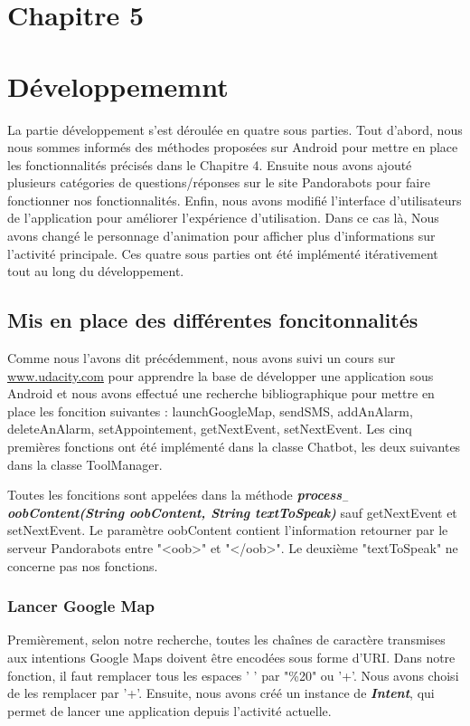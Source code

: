 \section*{Chapitre 5}
\section{Développememnt}
	La partie développement s'est déroulée en quatre sous parties. Tout d'abord, nous nous sommes informés des méthodes proposées sur Android pour mettre en place les fonctionnalités précisés dans le Chapitre 4. Ensuite nous avons ajouté plusieurs catégories de questions/réponses sur le site Pandorabots pour faire fonctionner nos fonctionnalités. Enfin, nous avons modifié l'interface d'utilisateurs de l'application pour améliorer l'expérience d'utilisation. Dans ce cas là, Nous avons changé le personnage d'animation pour afficher plus d'informations sur l'activité principale. Ces quatre sous parties ont été implémenté itérativement tout au long du développement.

\subsection{Mis en place des différentes foncitonnalités}
	
\indent Comme nous l'avons dit précédemment, nous avons suivi un cours sur \url{www.udacity.com} pour apprendre la base de développer une application sous Android et nous avons effectué une recherche bibliographique pour mettre en place les foncition suivantes : launchGoogleMap, sendSMS, addAnAlarm, deleteAnAlarm, setAppointement, getNextEvent, setNextEvent. Les cinq premières fonctions ont été implémenté dans la classe Chatbot, les deux suivantes dans la classe ToolManager.

\indent Toutes les foncitions sont appelées dans la méthode \textbf{\emph{process$_-$oobContent(String oobContent, String textToSpeak)}} sauf getNextEvent et setNextEvent. Le paramètre oobContent contient l'information retourner par le serveur Pandorabots entre "<oob>" et "</oob>". Le deuxième "textToSpeak" ne concerne pas nos fonctions.

\subsubsection{Lancer Google Map}

\indent Premièrement, selon notre recherche, toutes les chaînes de caractère transmises aux intentions Google Maps doivent être encodées sous forme d'URI. Dans notre fonction, il faut remplacer tous les espaces ' ' par "\%20" ou '+'. Nous avons choisi de les remplacer par '+'. Ensuite, nous avons créé un instance de \textbf{\emph{Intent}}, qui permet de lancer une application depuis l'activité actuelle. 

